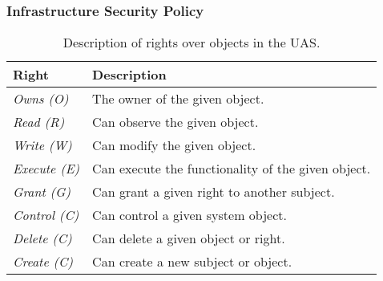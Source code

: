 \documentclass[10pt,journal,compsoc]{IEEEtran}
\begin{document}
\subsubsection{Infrastructure Security Policy}

\begin{table}[]
  \caption{Description of rights over objects in the UAS.}
  \begin{tabular}{ll}
  \hline
  \textbf{Right}       & \textbf{Description}                               \\ 
  \hline
  \textit{Owns (O)}    & The owner of the given object.                     \\
  \textit{Read (R)}    & Can observe the given object.                      \\
  \textit{Write (W)}   & Can modify the given object.                       \\
  \textit{Execute (E)} & Can execute the functionality of the given object. \\
  \textit{Grant (G)}   & Can grant a given right to another subject.        \\
  \textit{Control (C)} & Can control a given system object.                 \\
  \textit{Delete (C)}  & Can delete a given object or right.                 \\
  \textit{Create (C)}  & Can create a new subject or object.                 \\
  \hline
  \end{tabular}
\end{table}
\end{document}
